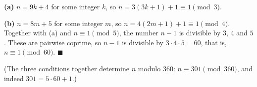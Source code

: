 \textbf{(a)} $n=9k+4$ for some integer $k$, so $n=3(3k+1)+1\equiv1\pmod3$.

\textbf{(b)} $n=8m+5$ for some integer $m$, so $n=4(2m+1)+1\equiv1\pmod4$. Together with (a) and $n\equiv1\pmod5$, the number $n-1$ is divisible by $3$, $4$ and $5$. These are pairwise coprime, so $n-1$ is divisible by $3\cdot4\cdot5=60$, that is, $n\equiv1\pmod{60}$. $\blacksquare$

(The three conditions together determine $n$ modulo $360$: $n\equiv301\pmod{360}$, and indeed $301=5\cdot60+1$.)
